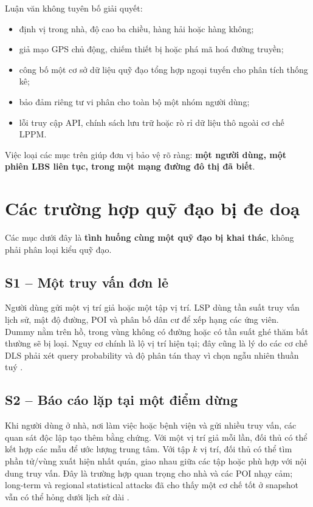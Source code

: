 \documentclass[12pt,a4paper,oneside]{report}
\begin{document}
Luận văn không tuyên bố giải quyết:

\begin{itemize}
  \item định vị trong nhà, độ cao ba chiều, hàng hải hoặc hàng không;
  \item giả mạo GPS chủ động, chiếm thiết bị hoặc phá mã hoá đường truyền;
  \item công bố một cơ sở dữ liệu quỹ đạo tổng hợp ngoại tuyến cho phân tích thống kê;
  \item bảo đảm riêng tư vi phân cho toàn bộ một nhóm người dùng;
  \item lỗi truy cập API, chính sách lưu trữ hoặc rò rỉ dữ liệu thô ngoài cơ chế LPPM.
\end{itemize}

Việc loại các mục trên giúp đơn vị bảo vệ rõ ràng: \textbf{một người dùng, một phiên LBS liên tục, trong một mạng đường đô thị đã biết}.

\chapter{Các trường hợp quỹ đạo bị đe doạ}

Các mục dưới đây là \textbf{tình huống cùng một quỹ đạo bị khai thác}, không phải phân loại kiểu quỹ đạo.

\section{S1 -- Một truy vấn đơn lẻ}

Người dùng gửi một vị trí giả hoặc một tập vị trí. LSP dùng tần suất truy vấn lịch sử, mật độ đường, POI và phân bố dân cư để xếp hạng các ứng viên. Dummy nằm trên hồ, trong vùng không có đường hoặc có tần suất ghé thăm bất thường sẽ bị loại. Nguy cơ chính là lộ vị trí hiện tại; đây cũng là lý do các cơ chế DLS phải xét query probability và độ phân tán thay vì chọn ngẫu nhiên thuần tuý \citep{niu2014dls}.

\section{S2 -- Báo cáo lặp tại một điểm dừng}

Khi người dùng ở nhà, nơi làm việc hoặc bệnh viện và gửi nhiều truy vấn, các quan sát độc lập tạo thêm bằng chứng. Với một vị trí giả mỗi lần, đối thủ có thể kết hợp các mẫu để ước lượng trung tâm. Với tập $k$ vị trí, đối thủ có thể tìm phần tử/vùng xuất hiện nhất quán, giao nhau giữa các tập hoặc phù hợp với nội dung truy vấn. Đây là trường hợp quan trọng cho nhà và các POI nhạy cảm; long-term và regional statistical attacks đã cho thấy một cơ chế tốt ở snapshot vẫn có thể hỏng dưới lịch sử dài \citep{sun2017asa}.
\end{document}
